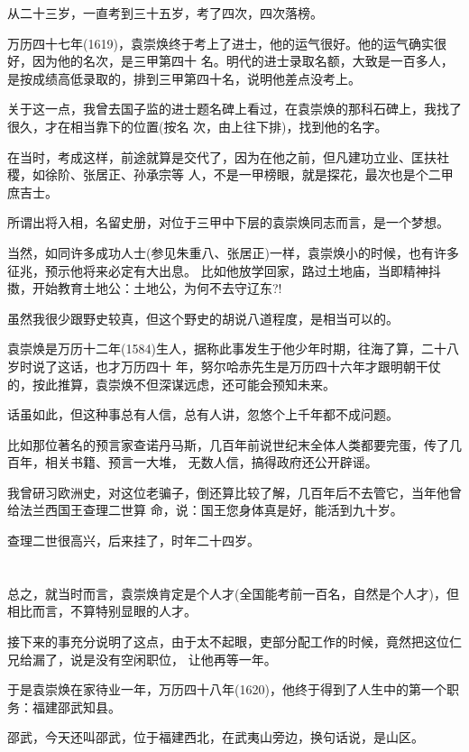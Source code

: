 \documentclass[11pt,a4paper,onecolumn]{article}
\begin{document}
从二十三岁，一直考到三十五岁，考了四次，四次落榜。

万历四十七年(1619)，袁崇焕终于考上了进士，他的运气很好。他的运气确实很好，因为他的名次，是三甲第四十
名。明代的进士录取名额，大致是一百多人，是按成绩高低录取的，排到三甲第四十名，说明他差点没考上。

关于这一点，我曾去国子监的进士题名碑上看过，在袁崇焕的那科石碑上，我找了很久，才在相当靠下的位置(按名
次，由上往下排)，找到他的名字。

在当时，考成这样，前途就算是交代了，因为在他之前，但凡建功立业、匡扶社稷，如徐阶、张居正、孙承宗等
人，不是一甲榜眼，就是探花，最次也是个二甲庶吉士。

所谓出将入相，名留史册，对位于三甲中下层的袁崇焕同志而言，是一个梦想。

当然，如同许多成功人士(参见朱重八、张居正)一样，袁崇焕小的时候，也有许多征兆，预示他将来必定有大出息。
比如他放学回家，路过土地庙，当即精神抖擞，开始教育土地公：土地公，为何不去守辽东?!

虽然我很少跟野史较真，但这个野史的胡说八道程度，是相当可以的。

袁崇焕是万历十二年(1584)生人，据称此事发生于他少年时期，往海了算，二十八岁时说了这话，也才万历四十
年，努尔哈赤先生是万历四十六年才跟明朝干仗的，按此推算，袁崇焕不但深谋远虑，还可能会预知未来。

话虽如此，但这种事总有人信，总有人讲，忽悠个上千年都不成问题。

比如那位著名的预言家查诺丹马斯，几百年前说世纪末全体人类都要完蛋，传了几百年，相关书籍、预言一大堆，
无数人信，搞得政府还公开辟谣。

我曾研习欧洲史，对这位老骗子，倒还算比较了解，几百年后不去管它，当年他曾给法兰西国王查理二世算
命，说：国王您身体真是好，能活到九十岁。

查理二世很高兴，后来挂了，时年二十四岁。

\section[\thesection]{}

总之，就当时而言，袁崇焕肯定是个人才(全国能考前一百名，自然是个人才)，但相比而言，不算特别显眼的人才。

接下来的事充分说明了这点，由于太不起眼，吏部分配工作的时候，竟然把这位仁兄给漏了，说是没有空闲职位，
让他再等一年。

于是袁崇焕在家待业一年，万历四十八年(1620)，他终于得到了人生中的第一个职务：福建邵武知县。

邵武，今天还叫邵武，位于福建西北，在武夷山旁边，换句话说，是山区。
\end{document}
